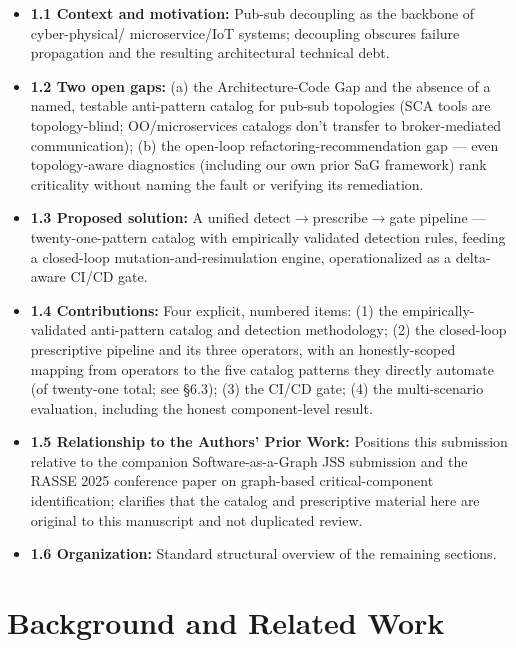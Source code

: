 \documentclass[11pt]{article}
\begin{document}
\begin{itemize}[leftmargin=*]
\item \textbf{1.1 Context and motivation:} Pub-sub decoupling as the backbone of cyber-physical/
  microservice/IoT systems; decoupling obscures failure propagation and the resulting architectural
  technical debt.
\item \textbf{1.2 Two open gaps:} (a) the Architecture-Code Gap and the absence of a named, testable
  anti-pattern catalog for pub-sub topologies (SCA tools are topology-blind; OO/microservices catalogs
  don't transfer to broker-mediated communication); (b) the open-loop refactoring-recommendation gap
  --- even topology-aware diagnostics (including our own prior SaG framework) rank criticality
  without naming the fault or verifying its remediation.
\item \textbf{1.3 Proposed solution:} A unified detect$\to$prescribe$\to$gate pipeline ---
  twenty-one-pattern catalog with empirically validated detection rules, feeding a closed-loop
  mutation-and-resimulation engine, operationalized as a delta-aware CI/CD gate.
\item \textbf{1.4 Contributions:} Four explicit, numbered items: (1) the empirically-validated
  anti-pattern catalog and detection methodology; (2) the closed-loop prescriptive pipeline and its
  three operators, with an honestly-scoped mapping from operators to the five catalog patterns they
  directly automate (of twenty-one total; see \S6.3); (3) the CI/CD gate; (4) the multi-scenario
  evaluation, including the honest component-level result.
\item \textbf{1.5 Relationship to the Authors' Prior Work:} Positions this submission relative to the
  companion Software-as-a-Graph JSS submission and the RASSE 2025 conference paper on graph-based
  critical-component identification; clarifies that the catalog and prescriptive material here are
  original to this manuscript and not duplicated review.
\item \textbf{1.6 Organization:} Standard structural overview of the remaining sections.
\end{itemize}

\section{Background and Related Work}
\end{document}
